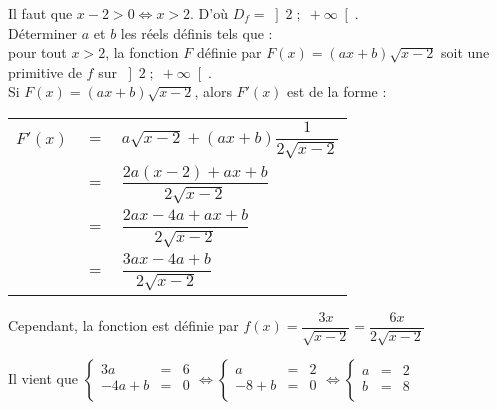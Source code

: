 \vspace*{.3cm}

Il faut que $x-2 > 0 \Longleftrightarrow x > 2$. D'où $D_f = \left]2 \;  ;\; +\infty\right[$. \\

Déterminer $a$ et $b$ les réels définis tels que : \\ pour tout $x > 2$, la fonction $F$ définie par $F(x) = \left(ax+b\right)\sqrt{x-2}$ soit une primitive de $f$ sur $\left]2 \; ; \; +\infty\right[$. \\

Si $F(x) = \left(ax+b\right)\sqrt{x-2}$, alors $F'(x)$ est de la forme : \\

\begin{tabular}{lll}
\hspace*{-.3cm} $F'(x)$ & $=$ & $a\sqrt{x-2} + \left(ax+b\right) \dfrac{1}{2\sqrt{x-2}}$ \vspace*{.3cm} \\
& $=$ & $\dfrac{2a\left(x-2\right) + ax + b}{2\sqrt{x-2}}$ \vspace*{.3cm} \\
& $=$ & $\dfrac{2ax - 4a + ax + b}{2\sqrt{x-2}}$ \vspace*{.3cm} \\
& $=$ & $\dfrac{3ax - 4a + b}{2\sqrt{x-2}}$ \vspace*{.3cm} \\
\end{tabular}

Cependant, la fonction est définie par $f(x) = \dfrac{3x}{\sqrt{x-2}} = \dfrac{6x}{2\sqrt{x-2}}$ \\

\vspace*{.3cm}

Il vient que $\left\{
  \begin{array}{rll}
    3a & = & 6 \\
    -4a + b & = & 0 \\
  \end{array}
\right. \Longleftrightarrow \left\{
  \begin{array}{rll}
    a & = & 2 \\
    -8 + b & = & 0 \\
  \end{array}
\right. \Longleftrightarrow \left\{
  \begin{array}{rll}
    a & = & 2 \\
    b & = & 8 \\
  \end{array}
\right.$ \\

